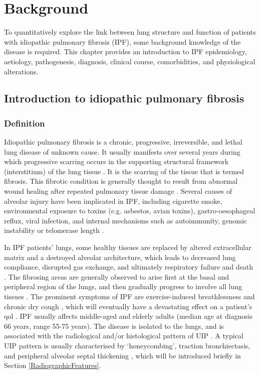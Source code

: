 \chapter{Background} \label{Yuwen_Background}
To quantitatively explore the link between lung structure and function of patients with idiopathic pulmonary fibrosis (IPF), some background knowledge of the disease is required. This chapter provides an introduction to IPF epidemiology, aetiology, pathogenesis, diagnosis, clinical course, comorbidities, and physiological alterations.

\section{Introduction to idiopathic pulmonary fibrosis} 
\subsection{Definition} 
Idiopathic pulmonary fibrosis is a chronic, progressive, irreversible, and lethal lung disease of unknown cause. It usually manifests over several years during which progressive scarring occurs in the supporting structural framework (interstitium) of the lung tissue \citep{meltzer2008idiopathic, raghu2011official}. It is the scarring of the tissue that is termed fibrosis. This fibrotic condition is generally thought to result from abnormal wound healing after repeated pulmonary tissue damage \citep{king2011idiopathic}. Several causes of alveolar injury have been implicated in IPF, including cigarette smoke, environmental exposure to toxins (e.g. asbestos, avian toxins), gastro-oesophageal reflux, viral infection, and internal mechanisms such as autoimmunity, genomic instability or telomerase length \citep{raghu2011official, ahluwalia2014new}.

In IPF patients' lungs, some healthy tissues are replaced by altered extracellular matrix and a destroyed alveolar architecture, which leads to decreased lung compliance, disrupted gas exchange, and ultimately respiratory failure and death \citep{richeldi2017idiopathic}. The fibrosing areas are generally observed to arise first at the basal and peripheral region of the lungs, and then gradually progress to involve all lung tissues \citep{martinez2017idiopathic}. The prominent symptoms of IPF are exercise-induced breathlessness and chronic dry cough \citep{meltzer2008idiopathic}, which will eventually have a devastating effect on a patient’s \gls{qol} \citep{kim2015natural}. IPF usually affects middle-aged and elderly adults (median age at diagnosis 66 years, range 55-75 years). The disease is isolated to the lungs, and is associated with the radiological and/or histological pattern of UIP \citep{king2011idiopathic,raghu2011official,xaubet2017idiopathic}. A typical UIP pattern is usually characterised by ‘honeycombing’, traction bronchiectasis, and peripheral alveolar septal thickening \citep{martinez2017idiopathic}, which will be introduced briefly in Section \ref{RadiographicFeatures}.

